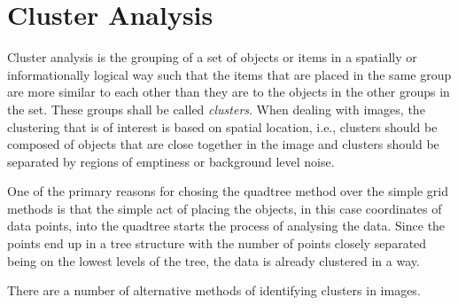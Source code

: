 
\part{Cluster Analysis}
\label{prt:cluster_analysis}

Cluster analysis is the grouping of a set of objects or items in a spatially or
informationally logical way such that the items that are placed in the same
group are more similar to each other than they are to the objects in the other
groups in the set. These groups shall be called \emph{clusters}. When dealing
with images, the clustering that is of interest is based on spatial location,
i.e., clusters should be composed of objects that are close together in the
image and clusters should be separated by regions of emptiness or background
level noise.

One of the primary reasons for chosing the quadtree method over the simple grid
methods is that the simple act of placing the objects, in this case coordinates
of data points, into the quadtree starts the process of analysing the data.
Since the points end up in a tree structure with the number of points closely
separated being on the lowest levels of the tree, the data is already clustered
in a way.

There are a number of alternative methods of identifying clusters in images.
